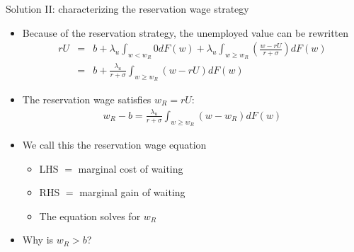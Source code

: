 \documentclass[9pt]{beamer}
\newcommand{\bit}{\begin{itemize}}
\newcommand{\eit}{\end{itemize}}
\newcommand{\bc}{\color{blue}}
\begin{document}
\begin{frame}{Solution II: characterizing the reservation wage strategy}

\bit
\setlength\itemsep{1.5em}

\item Because of the reservation strategy, the unemployed value can be rewritten
\begin{eqnarray}
rU  &=& b + \lambda_u  \int_{w< w_R} 0 dF(w) + \lambda_u  \int_{w\geq w_R} \left(\frac{w-r U}{r+\sigma} \right) dF(w) \nonumber\\
&=& b + \frac{\lambda_u}{r+\sigma}  \int_{w\geq w_R} (w-r U) dF(w) \nonumber 
\end{eqnarray}

\item The reservation wage satisfies $w_R=rU$: 
\begin{eqnarray}
w_R  -b = \frac{\lambda_u }{r+\sigma} \int_{w\geq w_R} (w-w_R) dF(w) \nonumber
\end{eqnarray}
\item We call this the {\bc reservation wage equation}
\bit
\setlength\itemsep{0.5em}
	\item LHS $=$ marginal cost of waiting

	\item RHS $=$ marginal gain of waiting 
	
	\item The equation solves for $w_R$
\eit

\item Why is $w_R>b$?

\eit
\end{frame}


%
%
%
%
%
%
%
\end{document}
